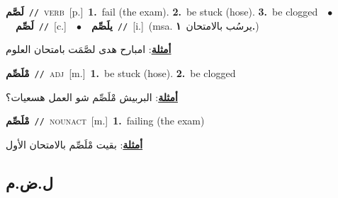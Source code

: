 \documentclass[10pt,a4paper,twoside]{article} %
\begin{document}
\begin{multicols}{2}
{\setlength\topsep{0pt}\textbf{\foreignlanguage{arabic}{لَصَّم}}\ {\color{gray}\texttt{//}\color{black}}\ \textsc{verb}\ [p.]\ \textbf{1.}~fail (the exam).  \textbf{2.}~be stuck (hose).  \textbf{3.}~be clogged\ \ $\bullet$\ \ \setlength\topsep{0pt}\textbf{\foreignlanguage{arabic}{لَصِّم}}\ {\color{gray}\texttt{//}\color{black}}\ [c.]\ \ $\bullet$\ \ \setlength\topsep{0pt}\textbf{\foreignlanguage{arabic}{يلَصِّم}}\ {\color{gray}\texttt{//}\color{black}}\ [i.]\ \color{gray}(msa. \foreignlanguage{arabic}{يرسُب بالامتحان}~\foreignlanguage{arabic}{\textbf{١.}})\color{black}\  \begin{flushright}\color{gray}\foreignlanguage{arabic}{\textbf{\underline{\foreignlanguage{arabic}{أمثلة}}}: امبارح هدى لصَّمَت بامتحان العلوم}\end{flushright}\color{black}} \vspace{2mm}

{\setlength\topsep{0pt}\textbf{\foreignlanguage{arabic}{مْلَصِّم}}\ {\color{gray}\texttt{//}\color{black}}\ \textsc{adj}\ [m.]\ \textbf{1.}~be stuck (hose).  \textbf{2.}~be clogged\  \begin{flushright}\color{gray}\foreignlanguage{arabic}{\textbf{\underline{\foreignlanguage{arabic}{أمثلة}}}: البربيش مْلَصِّم شو العمل هسعيات؟}\end{flushright}\color{black}} \vspace{2mm}

{\setlength\topsep{0pt}\textbf{\foreignlanguage{arabic}{مْلَصِّم}}\ {\color{gray}\texttt{//}\color{black}}\ \textsc{noun\textunderscore act}\ [m.]\ \textbf{1.}~failing (the exam)\  \begin{flushright}\color{gray}\foreignlanguage{arabic}{\textbf{\underline{\foreignlanguage{arabic}{أمثلة}}}: بقيت مْلَصِّم بالامتحان الأول}\end{flushright}\color{black}} \vspace{2mm}

\vspace{-3mm}
\subsection*{\color{blue}\foreignlanguage{arabic}{ل.ض.م}\color{blue}{}} 


\end{multicols}
\end{document}
